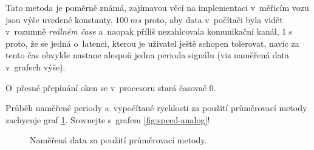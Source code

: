 Tato metoda je poměrně známá, zajímavou věcí na implementaci v~měřicím vozu
jsou výše uvedené konstanty. $100\ ms$ proto, aby data v~počítači byla vidět
v~rozumně \textit{reálném čase} a~naopak příliš nezahlcovala komunikační kanál,
$1\ s$ proto, že se jedná o~latenci, kterou je uživatel ještě schopen tolerovat,
navíc za tento čas obvykle nastane alespoň jedna perioda signálu (viz naměřená
data v~grafech výše).

O~přesné přepínání oken se v~procesoru stará časovač 0.

Průběh naměřené periody a~vypočítané rychlosti za použití průměrovací metody
zachycuje graf \ref{fig:prumer}. Srovnejte s~grafem \ref{fig:speed-analog}!

\begin{figure}[h]

\caption{Naměřená data za použití průměrovací metody.}
\label{fig:prumer}
\end{figure}
